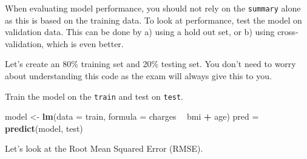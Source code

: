 \documentclass[]{book}
\newenvironment{Shaded}{\begin{snugshade}}{\end{snugshade}}
\newcommand{\CommentTok}[1]{\textcolor[rgb]{0.56,0.35,0.01}{\textit{#1}}}
\newcommand{\ControlFlowTok}[1]{\textcolor[rgb]{0.13,0.29,0.53}{\textbf{#1}}}
\newcommand{\DataTypeTok}[1]{\textcolor[rgb]{0.13,0.29,0.53}{#1}}
\newcommand{\DecValTok}[1]{\textcolor[rgb]{0.00,0.00,0.81}{#1}}
\newcommand{\FloatTok}[1]{\textcolor[rgb]{0.00,0.00,0.81}{#1}}
\newcommand{\KeywordTok}[1]{\textcolor[rgb]{0.13,0.29,0.53}{\textbf{#1}}}
\newcommand{\NormalTok}[1]{#1}
\newcommand{\OperatorTok}[1]{\textcolor[rgb]{0.81,0.36,0.00}{\textbf{#1}}}
\newcommand{\StringTok}[1]{\textcolor[rgb]{0.31,0.60,0.02}{#1}}
\begin{document}
When evaluating model performance, you should not rely on the \texttt{summary} alone as this is based on the training data. To look at performance, test the model on validation data. This can be done by a) using a hold out set, or b) using cross-validation, which is even better.

Let's create an 80\% training set and 20\% testing set. You don't need to worry about understanding this code as the exam will always give this to you.

\begin{Shaded}
\end{Shaded}

Train the model on the \texttt{train} and test on \texttt{test}.

\begin{Shaded}
\begin{Highlighting}[]
\NormalTok{model <-}\StringTok{ }\KeywordTok{lm}\NormalTok{(}\DataTypeTok{data =}\NormalTok{ train, }\DataTypeTok{formula =}\NormalTok{ charges }\OperatorTok{~}\StringTok{ }\NormalTok{bmi }\OperatorTok{+}\StringTok{ }\NormalTok{age)}
\NormalTok{pred =}\StringTok{ }\KeywordTok{predict}\NormalTok{(model, test)}
\end{Highlighting}
\end{Shaded}

Let's look at the Root Mean Squared Error (RMSE).

\begin{Shaded}
\end{Shaded}
\end{document}
